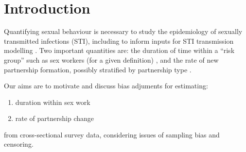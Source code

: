 \section{Introduction}
Quantifying sexual behaviour
is necessary to study the epidemiology of sexually transmitted infections (STI),
including to inform inputs for STI transmission modelling \cite{Fenton2001}.
Two important quantities are:
the duration of time within a ``risk group'' such as sex workers (for a given definition)
\cite{?}, and
the rate of new partnership formation, possibly stratified by partnership type
\cite{?}.
\par
Our aims are to motivate and discuss bias adjuments for estimating:
\begin{enumerate}
  \item duration within sex work
  \item rate of partnership change
\end{enumerate}
from cross-sectional survey data,
considering issues of sampling bias and censoring.
